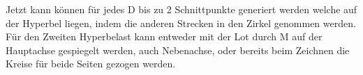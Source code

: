Jetzt kann können für jedes D bis zu 2 Schnittpunkte generiert werden welche auf der Hyperbel liegen, indem die anderen Strecken in den Zirkel genommen werden. Für den Zweiten Hyperbelast kann entweder mit der Lot durch M auf der Hauptachse gespiegelt werden, auch Nebenachse, oder bereits beim Zeichnen die Kreise für beide Seiten gezogen werden.\\